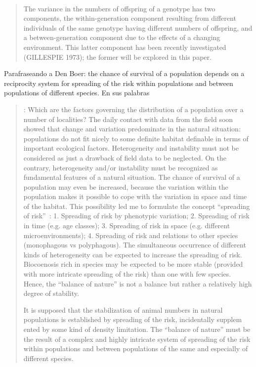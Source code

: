 \documentclass[a4paper,10pt]{article}
\begin{document}
\\

\begin{quotation} \cite{gillespie1974-variance}
    The variance in the numbers of offspring of a genotype has two components, the within-generation component resulting from different individuals of the same genotype having different numbers of offspring, and a between-generation component due to the effects of a changing environment.
    This latter component has been recently investigated (GILLESPIE 1973); the former will be explored in this paper.
\end{quotation}


Parafraseando a Den Boer: the chance of survival of a population depends on a reciprocity system for spreading of the risk within populations and between populations of different species.
En sus palabras
\begin{quotation} \cite{denBoer1968-spreadingRisk}: 
    Which are the factors governing the distribution of a population over a number of localities?
    The daily contact with data from the field soon showed that change and variation predominate in the natural situation: populations do not fit
    nicely to some definite habitat definable in terms of important ecological factors.
    Heterogeneity and instability must not be considered as just a drawback of field data to be neglected.
    On the contrary, heterogeneity and/or instability must be recognized as fundamental features of a natural situation.
    The chance of survival of a population may even be increased, because the variation within the population makes it possible to cope with the variation in space and time of the habitat.
    This possibility led me to formulate the concept ``spreading of risk''~\cite{denBoer1968-spreadingRisk}: 1. Spreading of risk by phenotypic variation; 2. Spreading of risk in time (e.g. age classes); 3. Spreading of risk in space (e.g. different microenvironments); 4. Spreading of risk and relations to other species (monophagous vs polyphagous).
    The simultaneous occurrence of different kinds of heterogeneity can be expected to increase the spreading of risk.
    Biocoenosis rich in species may be expected to be more stable (provided with more intricate spreading of the risk) than one with few species.
    Hence, the ``balance of nature'' is not a balance but rather a relatively high degree of stability.

    It is supposed that the stabilization of animal numbers in natural populations is established by spreading of the risk, incidentally supplem ented by some kind of density limitation.
    The ``balance of nature'' must be the result of a complex and highly intricate system of spreading of the risk within populations and between populations of the same and especially of different species.
\end{quotation}
\end{document}
